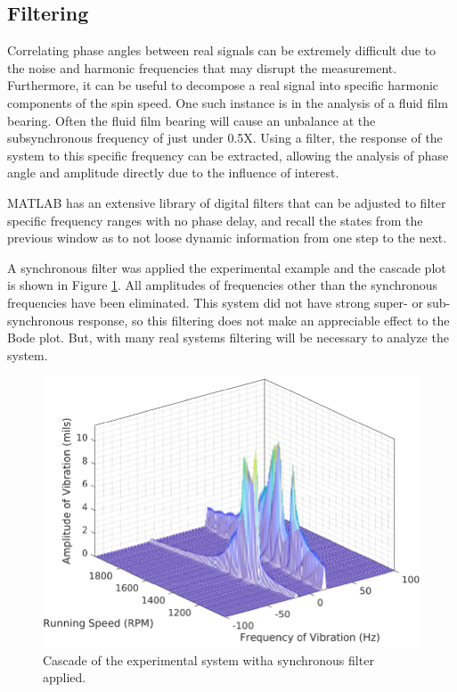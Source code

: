 \subsection{Filtering}
Correlating phase angles between real signals can be extremely difficult due to the noise and harmonic frequencies that may disrupt the measurement. Furthermore, it can be useful to decompose a real signal into specific harmonic components of the spin speed. One such instance is in the analysis of a fluid film bearing. Often the fluid film bearing will cause an unbalance at the subsynchronous frequency of just under 0.5X. Using a filter, the response of the system to this specific frequency can be extracted, allowing the analysis of phase angle and amplitude directly due to the influence of interest.\par 
MATLAB has an extensive library of digital filters that can be adjusted to filter specific frequency ranges with no phase delay, and recall the states from the previous window as to not loose dynamic information from one step to the next.\par 
A synchronous filter was applied the experimental example and the cascade plot is shown in Figure \ref{fig:ExpExampleCascade2}. All amplitudes of frequencies other than the synchronous frequencies have been eliminated. This system did not have strong super- or sub-synchronous response, so this filtering does not make an appreciable effect to the Bode plot. But, with many real systems filtering will be necessary to analyze the system.
\begin{figure}
	\centering
	\includegraphics[width=\linewidth]{./figures/ExpExampleCascade2.pdf}
	\caption{Cascade of the experimental system witha synchronous filter applied.}
	\label{fig:ExpExampleCascade2}
\end{figure}